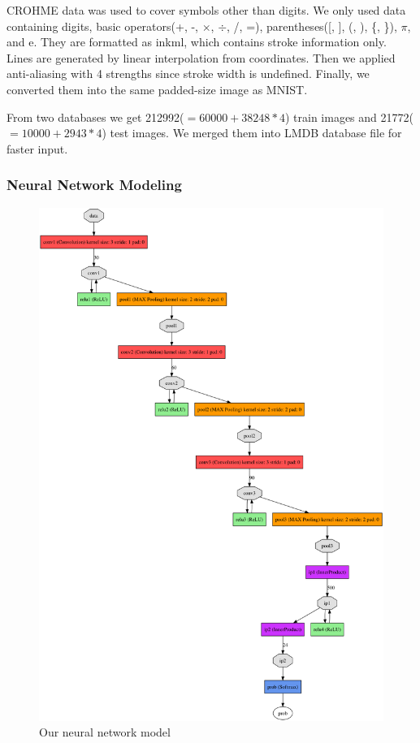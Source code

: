 \documentclass[10pt,twocolumn,letterpaper]{article}
\begin{document}
CROHME data was used to cover symbols other than digits.
We only used data containing digits, basic operators(+, -, $\times$, $\div$, /, =), parentheses([, ], (, ), \{, \}), $\pi$, and e.
They are formatted as inkml, which contains stroke information only.
Lines are generated by linear interpolation from coordinates.
Then we applied anti-aliasing with 4 strengths since stroke width is undefined.
Finally, we converted them into the same padded-size image as MNIST.

From two databases we get 212992($=60000+38248*4$) train images and 21772($=10000+2943*4$) test images.
We merged them into LMDB database file for faster input.

\subsubsection{Neural Network Modeling}

\begin{figure}[t]
\centering
\includegraphics[width=0.9\linewidth]{img/model.png}
\caption{Our neural network model}
\label{fig:model}
\end{figure}
\end{document}
